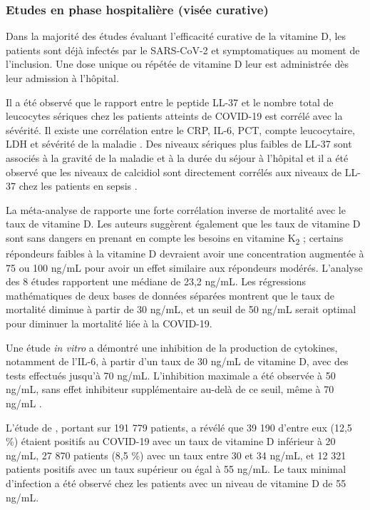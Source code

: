 \documentclass[
  a4paper,
  DIV=11,
  numbers=noendperiod,
  listof=totoc]{scrreprt}
\begin{document}
\subsubsection{Etudes en phase hospitalière (visée
curative)}\label{etudes-en-phase-hospitaliuxe8re-visuxe9e-curative}

Dans la majorité des études évaluant l'efficacité curative de la
vitamine D, les patients sont déjà infectés par le \ac{SARS-CoV-2} et
symptomatiques au moment de l'inclusion. Une dose unique ou répétée de
vitamine D leur est administrée dès leur admission à l'hôpital.

Il a été observé que le rapport entre le peptide LL-37 et le nombre
total de leucocytes sériques chez les patients atteints de COVID-19 est
corrélé avec la sévérité. Il existe une corrélation entre le \ac{CRP},
\ac{IL-6}, \ac{PCT}, compte leucocytaire, \ac{LDH} et sévérité de la
maladie \autocite{Keutmann.2022}. Des niveaux sériques plus faibles de
LL-37 sont associés à la gravité de la maladie et à la durée du séjour à
l'hôpital \autocite{Keutmann.2022} et il a été observé que les niveaux
de calcidiol sont directement corrélés aux niveaux de LL-37 chez les
patients en sepsis \autocite{Cutuli.2024}.

La méta-analyse de \textcite{Borsche.2021} rapporte une forte
corrélation inverse de mortalité avec le taux de vitamine D. Les auteurs
suggèrent également que les taux de vitamine D sont sans dangers en
prenant en compte les besoins en vitamine K\textsubscript{2} ; certains
répondeurs faibles à la vitamine D devraient avoir une concentration
augmentée à 75 ou 100 ng/mL pour avoir un effet similaire aux répondeurs
modérés. L'analyse des 8 études rapportent une médiane de 23,2 ng/mL.
Les régressions mathématiques de deux bases de données séparées montrent
que le taux de mortalité diminue à partir de 30 ng/mL, et un seuil de 50
ng/mL serait optimal pour diminuer la mortalité liée à la COVID-19.

Une étude \emph{in vitro} a démontré une inhibition de la production de
cytokines, notamment de l'\ac{IL-6}, à partir d'un taux de 30 ng/mL de
vitamine D, avec des tests effectués jusqu'à 70 ng/mL. L'inhibition
maximale a été observée à 50 ng/mL, sans effet inhibiteur supplémentaire
au-delà de ce seuil, même à 70 ng/mL \autocite{Zhang.2012}.

L'étude de \textcite{Kaufman.2020}, portant sur 191 779 patients, a
révélé que 39 190 d'entre eux (12,5 \%) étaient positifs au COVID-19
avec un taux de vitamine D inférieur à 20 ng/mL, 27 870 patients (8,5
\%) avec un taux entre 30 et 34 ng/mL, et 12 321 patients positifs avec
un taux supérieur ou égal à 55 ng/mL. Le taux minimal d'infection a été
observé chez les patients avec un niveau de vitamine D de 55 ng/mL.
\end{document}
